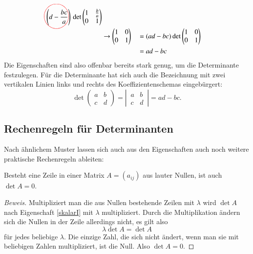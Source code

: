 \begin{align*}
\left(d-\frac{bc}a\right)%
\begin{picture}(0,0)
\color{red}\put(-22.5,4){\circle{35}}
\end{picture}%
\det\begin{pmatrix}1&\frac{b}{a}\\0&1\end{pmatrix}
\\
&\rightarrow
\begin{pmatrix}1&0\\0&1\end{pmatrix}
&
&=(ad-bc)
\det \begin{pmatrix}1&0\\0&1\end{pmatrix}
\\
&&&=ad-bc
\end{align*}
Die Eigenschaften sind also offenbar bereits stark genug, um die
Determinante festzulegen.
Für die Determinante hat sich auch die
Bezeichnung mit zwei vertikalen Linien links und rechts des
Koeffizientenschemas eingebürgert:
\[
\det\begin{pmatrix}a&b\\c&d\end{pmatrix}
=
\left|\,\begin{matrix}a&b\\c&d\end{matrix}\,\right|
=
ad-bc.
\]

\subsection{Rechenregeln für Determinanten}
Nach ähnlichem Muster lassen sich auch aus den Eigenschaften auch
noch weitere praktische Rechenregeln ableiten:

\begin{hilfssatz}
Besteht eine Zeile in einer Matrix $A=(a_{ij})$ aus
lauter Nullen, ist auch $\det A=0$.
\label{nullzeile}
\end{hilfssatz}

\begin{proof}[Beweis]
Multipliziert man die aus Nullen bestehende Zeilen mit $\lambda$
wird $\det A$ nach Eigenschaft \ref{skalarI}  mit $\lambda$ multipliziert.
Durch die Multiplikation ändern sich die Nullen in der Zeile allerdings
nicht, es gilt also
\[
\lambda \det A=\det A
\]
für jedes beliebige $\lambda$.
Die einzige Zahl, die sich nicht ändert,
wenn man sie mit beliebigen Zahlen multipliziert, ist die Null.
Also $\det A=0$.
\end{proof}

